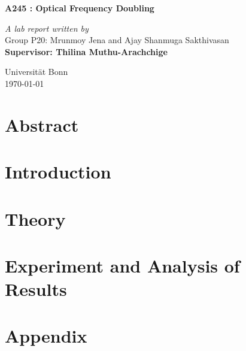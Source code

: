 \documentclass[a4paper]{report}
\begin{document}
\begin{onehalfspace}
\vspace*{0.5in}
\begin{center}
\begin{LARGE}
\textbf{A245 : Optical Frequency Doubling}\\ 
\end{LARGE}
\bigskip
\bigskip
\textit{A lab report written by}\\
Group P20: Mrunmoy Jena and Ajay Shanmuga Sakthivasan\\
\medskip
\textbf{Supervisor: Thilina Muthu-Arachchige}\\
\vspace*{5in}
\begin{flushright}
Universit\"{a}t	Bonn\\
\today
\end{flushright}
\end{center}
\tableofcontents
\chapter*{Abstract}


\chapter{Introduction}
%

\chapter{Theory}


\chapter{Experiment and Analysis of Results}

\end{onehalfspace}

\printbibliography[title = References]

\appendix
\chapter{Appendix}

\end{document}

